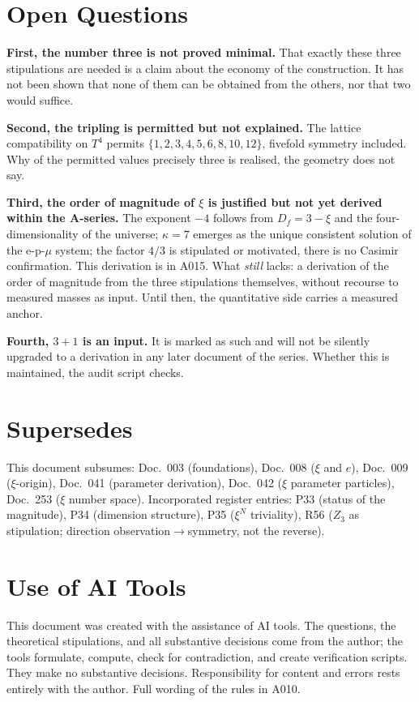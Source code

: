 \section{Open Questions}

\textbf{First, the number three is not proved minimal.} That exactly these
three stipulations are needed is a claim about the economy of the construction.
It has not been shown that none of them can be obtained from the others, nor
that two would suffice.

\textbf{Second, the tripling is permitted but not explained.} The
lattice compatibility on $T^4$ permits $\{1,2,3,4,5,6,8,10,12\}$, fivefold symmetry
included. Why of the permitted values precisely three is realised, the geometry does not say.

\textbf{Third, the order of magnitude of $\xi$ is justified but not yet
derived within the A-series.} The exponent $-4$ follows from $D_f=3-\xi$ and
the four-dimensionality of the universe; $\kappa=7$ emerges as the unique
consistent solution of the e-p-$\mu$ system; the factor $4/3$ is stipulated or
motivated, there is no Casimir confirmation. This derivation is in A015. What \emph{still}
lacks: a derivation of the order of magnitude from the three stipulations
themselves, without recourse to measured masses as input. Until then, the
quantitative side carries a measured anchor.

\textbf{Fourth, $3+1$ is an input.} It is marked as such and will not be
silently upgraded to a derivation in any later document of the series.
Whether this is maintained, the audit script checks.

\section{Supersedes}

This document subsumes: Doc.~003 (foundations), Doc.~008 ($\xi$ and $e$),
Doc.~009 ($\xi$-origin), Doc.~041 (parameter derivation), Doc.~042 ($\xi$
parameter particles), Doc.~253 ($\xi$ number space). Incorporated register
entries: P33 (status of the magnitude), P34 (dimension structure), P35
($\xi^N$ triviality), R56 ($Z_3$ as stipulation; direction observation$\to$symmetry,
not the reverse).

\section{Use of AI Tools}

This document was created with the assistance of AI tools. The questions,
the theoretical stipulations, and all substantive decisions come from the
author; the tools formulate, compute, check for contradiction, and create
verification scripts. They make no substantive decisions.
Responsibility for content and errors rests entirely with the author.
Full wording of the rules in A010.
